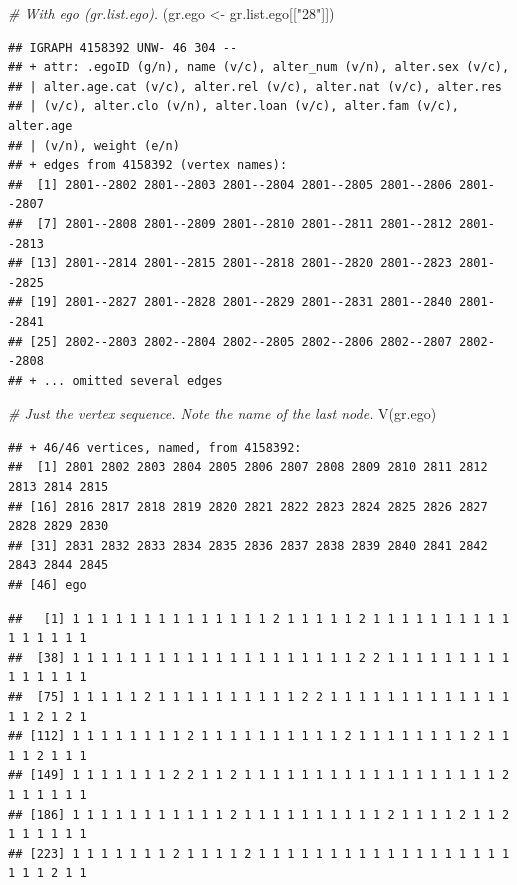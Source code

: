 \documentclass[
]{book}
\newenvironment{Shaded}{\begin{snugshade}}{\end{snugshade}}
\newcommand{\CommentTok}[1]{\textcolor[rgb]{0.56,0.35,0.01}{\textit{#1}}}
\newcommand{\FunctionTok}[1]{\textcolor[rgb]{0.00,0.00,0.00}{#1}}
\newcommand{\NormalTok}[1]{#1}
\newcommand{\OtherTok}[1]{\textcolor[rgb]{0.56,0.35,0.01}{#1}}
\newcommand{\SpecialCharTok}[1]{\textcolor[rgb]{0.00,0.00,0.00}{#1}}
\newcommand{\StringTok}[1]{\textcolor[rgb]{0.31,0.60,0.02}{#1}}
\begin{document}
\begin{Shaded}
\begin{Highlighting}[]
\CommentTok{\# With ego (gr.list.ego). }
\NormalTok{(gr.ego }\OtherTok{\textless{}{-}}\NormalTok{ gr.list.ego[[}\StringTok{"28"}\NormalTok{]])}
\end{Highlighting}
\end{Shaded}

\begin{verbatim}
## IGRAPH 4158392 UNW- 46 304 -- 
## + attr: .egoID (g/n), name (v/c), alter_num (v/n), alter.sex (v/c),
## | alter.age.cat (v/c), alter.rel (v/c), alter.nat (v/c), alter.res
## | (v/c), alter.clo (v/n), alter.loan (v/c), alter.fam (v/c), alter.age
## | (v/n), weight (e/n)
## + edges from 4158392 (vertex names):
##  [1] 2801--2802 2801--2803 2801--2804 2801--2805 2801--2806 2801--2807
##  [7] 2801--2808 2801--2809 2801--2810 2801--2811 2801--2812 2801--2813
## [13] 2801--2814 2801--2815 2801--2818 2801--2820 2801--2823 2801--2825
## [19] 2801--2827 2801--2828 2801--2829 2801--2831 2801--2840 2801--2841
## [25] 2802--2803 2802--2804 2802--2805 2802--2806 2802--2807 2802--2808
## + ... omitted several edges
\end{verbatim}

\begin{Shaded}
\begin{Highlighting}[]
\CommentTok{\# Just the vertex sequence. Note the name of the last node.}
\FunctionTok{V}\NormalTok{(gr.ego)}
\end{Highlighting}
\end{Shaded}

\begin{verbatim}
## + 46/46 vertices, named, from 4158392:
##  [1] 2801 2802 2803 2804 2805 2806 2807 2808 2809 2810 2811 2812 2813 2814 2815
## [16] 2816 2817 2818 2819 2820 2821 2822 2823 2824 2825 2826 2827 2828 2829 2830
## [31] 2831 2832 2833 2834 2835 2836 2837 2838 2839 2840 2841 2842 2843 2844 2845
## [46] ego
\end{verbatim}

\begin{Shaded}
\end{Shaded}

\begin{verbatim}
##   [1] 1 1 1 1 1 1 1 1 1 1 1 1 1 1 2 1 1 1 1 1 2 1 1 1 1 1 1 1 1 1 1 1 1 1 1 1 1
##  [38] 1 1 1 1 1 1 1 1 1 1 1 1 1 1 1 1 1 1 1 1 2 2 1 1 1 1 1 1 1 1 1 1 1 1 1 1 1
##  [75] 1 1 1 1 1 2 1 1 1 1 1 1 1 1 1 1 2 2 1 1 1 1 1 1 1 1 1 1 1 1 1 1 1 2 1 2 1
## [112] 1 1 1 1 1 1 1 1 2 1 1 1 1 1 1 1 1 1 1 2 1 1 1 1 1 1 1 1 2 1 1 1 1 2 1 1 1
## [149] 1 1 1 1 1 1 1 2 2 1 1 2 1 1 1 1 1 1 1 1 1 1 1 1 1 1 1 1 1 1 2 1 1 1 1 1 1
## [186] 1 1 1 1 1 1 1 1 1 1 1 2 1 1 1 1 1 1 1 1 1 1 2 1 1 1 1 2 1 1 2 1 1 1 1 1 1
## [223] 1 1 1 1 1 1 1 2 1 1 1 1 2 1 1 1 1 1 1 1 1 1 1 1 1 1 1 1 1 1 1 1 1 1 2 1 1
\end{verbatim}
\end{document}
